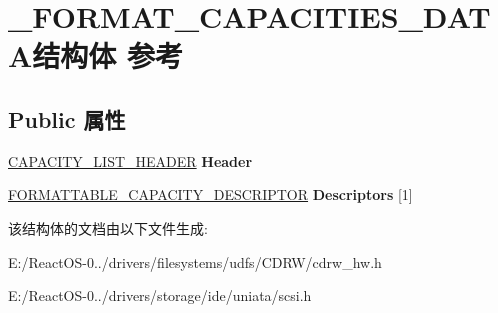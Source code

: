 \hypertarget{struct___f_o_r_m_a_t___c_a_p_a_c_i_t_i_e_s___d_a_t_a}{}\section{\+\_\+\+F\+O\+R\+M\+A\+T\+\_\+\+C\+A\+P\+A\+C\+I\+T\+I\+E\+S\+\_\+\+D\+A\+T\+A结构体 参考}
\label{struct___f_o_r_m_a_t___c_a_p_a_c_i_t_i_e_s___d_a_t_a}
\subsection*{Public 属性}
\begin{DoxyCompactItemize}
\item 
\mbox{\label{struct___f_o_r_m_a_t___c_a_p_a_c_i_t_i_e_s___d_a_t_a_a481d6fa9594121f626219670637ce24b}} 
\hyperlink{struct___c_a_p_a_c_i_t_y___l_i_s_t___h_e_a_d_e_r}{C\+A\+P\+A\+C\+I\+T\+Y\+\_\+\+L\+I\+S\+T\+\_\+\+H\+E\+A\+D\+ER} {\bfseries Header}
\item 
\mbox{\label{struct___f_o_r_m_a_t___c_a_p_a_c_i_t_i_e_s___d_a_t_a_a381366fdd5c3cee48909423a67df2ee5}} 
\hyperlink{struct___f_o_r_m_a_t_t_a_b_l_e___c_a_p_a_c_i_t_y___d_e_s_c_r_i_p_t_o_r}{F\+O\+R\+M\+A\+T\+T\+A\+B\+L\+E\+\_\+\+C\+A\+P\+A\+C\+I\+T\+Y\+\_\+\+D\+E\+S\+C\+R\+I\+P\+T\+OR} {\bfseries Descriptors} \mbox{[}1\mbox{]}
\end{DoxyCompactItemize}


该结构体的文档由以下文件生成\+:\begin{DoxyCompactItemize}
\item 
E\+:/\+React\+O\+S-\/0../drivers/filesystems/udfs/\+C\+D\+R\+W/cdrw\+\_\+hw.\+h\item 
E\+:/\+React\+O\+S-\/0../drivers/storage/ide/uniata/scsi.\+h\end{DoxyCompactItemize}
